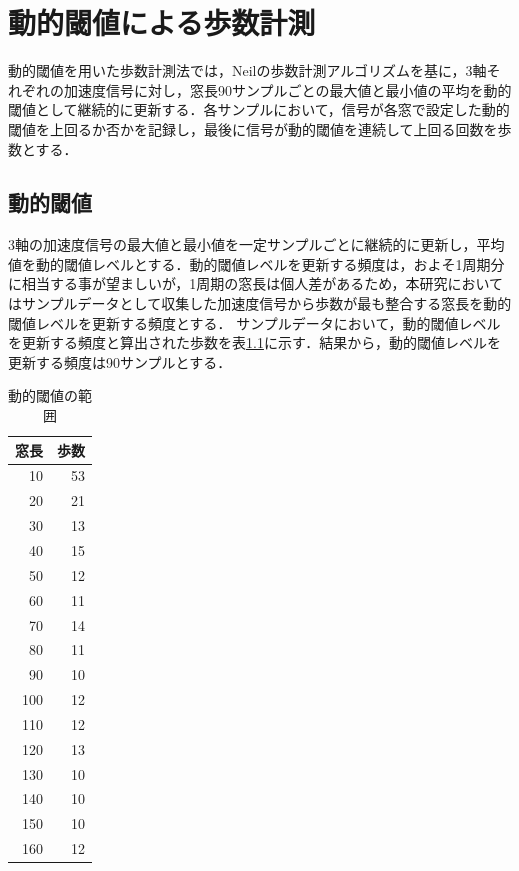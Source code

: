 \chapter{動的閾値による歩数計測}
動的閾値を用いた歩数計測法では，Neilの歩数計測アルゴリズム\cite{Neil10}を基に，3軸それぞれの加速度信号に対し，窓長90サンプルごとの最大値と最小値の平均を動的閾値として継続的に更新する．各サンプルにおいて，信号が各窓で設定した動的閾値を上回るか否かを記録し，最後に信号が動的閾値を連続して上回る回数を歩数とする．

\section{動的閾値}
3軸の加速度信号の最大値と最小値を一定サンプルごとに継続的に更新し，平均値を動的閾値レベルとする．動的閾値レベルを更新する頻度は，およそ1周期分に相当する事が望ましいが，1周期の窓長は個人差があるため，本研究においてはサンプルデータとして収集した加速度信号から歩数が最も整合する窓長を動的閾値レベルを更新する頻度とする．
サンプルデータにおいて，動的閾値レベルを更新する頻度と算出された歩数を表\ref{DySetting}に示す．結果から，動的閾値レベルを更新する頻度は90サンプルとする．
\begin{table}[htb]
  \begin{center}
    \caption{動的閾値の範囲}
    \label{DySetting}
    \begin{tabular}{|r|r|} \hline
      \multicolumn{1}{|c|}{窓長} & \multicolumn{1}{|c|}{歩数} \\ \hline \hline
      10 & 53 \\ \hline
      20 & 21 \\ \hline
      30 & 13 \\ \hline
      40 & 15 \\ \hline
      50 & 12 \\ \hline
      60 & 11 \\ \hline
      70 & 14 \\ \hline
      80 & 11 \\ \hline
      90 & 10 \\ \hline
      100 & 12 \\ \hline
      110 & 12 \\ \hline
      120 & 13 \\ \hline
      130 & 10 \\ \hline
      140 & 10 \\ \hline
      150 & 10 \\ \hline
      160 & 12 \\ \hline
    \end{tabular}
  \end{center}
\end{table}

